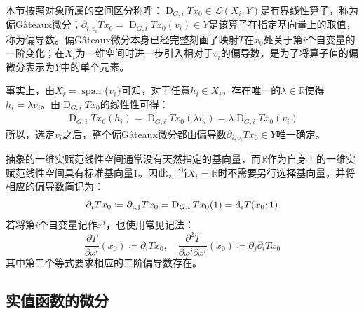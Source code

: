 \begin{note}
	本节按照对象所属的空间区分称呼：$\operatorname{D}_{G,i}Tx_0\in\mathcal{L}(X_i,Y)$是有界线性算子，称为偏G\^ateaux微分；$\partial_{i,v_i}Tx_0=\operatorname{D}_{G,i}Tx_0(v_i)\in Y$是该算子在指定基向量上的取值，称为偏导数。偏G\^ateaux微分本身已经完整刻画了映射$T$在$x_0$处关于第$i$个自变量的一阶变化；在$X_i$为一维空间时进一步引入相对于$v_i$的偏导数，是为了将算子值的偏微分表示为$Y$中的单个元素。\par
	事实上，由$X_i=\operatorname{span}\{v_i\}$可知，对于任意$h_i\in X_i$，存在唯一的$\lambda\in\mathbb{R}$使得$h_i=\lambda v_i$。由$\operatorname{D}_{G,i}Tx_0$的线性性可得：
	\begin{align*}
		\operatorname{D}_{G,i}Tx_0(h_i)=\operatorname{D}_{G,i}Tx_0(\lambda v_i)=\lambda\operatorname{D}_{G,i}Tx_0(v_i)
	\end{align*}
	所以，选定$v_i$之后，整个偏G\^ateaux微分都由偏导数$\partial_{i,v_i}Tx_0\in Y$唯一确定。\par
	抽象的一维实赋范线性空间通常没有天然指定的基向量，而$\mathbb{R}$作为自身上的一维实赋范线性空间具有标准基向量$1$。因此，当$X_i=\mathbb{R}$时不需要另行选择基向量，并将相应的偏导数简记为：
	\begin{equation*}
		\partial_iTx_0\coloneq\partial_{i,1}Tx_0
		=\operatorname{D}_{G,i}Tx_0(1)=\mathop{}\!\mathrm{d}_iT(x_0;1)
	\end{equation*}
	若将第$i$个自变量记作$x^i$，也使用常见记法：
	\begin{equation*}
		\frac{\partial T}{\partial x^i}(x_0)\coloneq\partial_iTx_0,\quad
		\frac{\partial^2T}{\partial x^j\partial x^i}(x_0)\coloneq\partial_j\partial_iTx_0
	\end{equation*}
	其中第二个等式要求相应的二阶偏导数存在。
\end{note}

\subsection{实值函数的微分}

